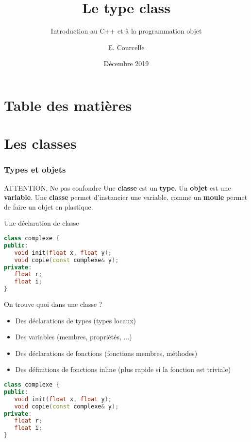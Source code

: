 \documentclass{beamer}
\title{Le type class}
\subtitle{Introduction au C++ et à la programmation objet}
\author{E. Courcelle}\institute{CALMIP, URA 3667}
\date{Décembre 2019}
\begin{document}
\begin{frame}
\titlepage
\end{frame}

\section*{Table des matières}
\begin{frame}
\tableofcontents
\end{frame}


\section{Les classes}

\begin{frame}[fragile=singleslide,shrink=20]
\frametitle {Types et objets}

\begin{block}{ATTENTION, Ne pas confondre}
Une \textbf{classe} est un \textbf{type}.
Un \textbf{objet} est une \textbf{variable}.
Une \textbf{classe} permet d'instancier une variable, comme un \textbf{moule} permet de faire un objet en plastique.
\end{block}

\begin{block}{Une déclaration de classe}
\begin{lstlisting}[language=c++]
class complexe {
public:
   void init(float x, float y);
   void copie(const complexe& y);
private:
   float r;
   float i;
}
\end{lstlisting}
\end{block}

\begin{block}{On trouve quoi dans une classe ?}
\begin{itemize}
\item{Des déclarations de types (types locaux)}
\item{Des variables (membres, propriétés, ...)}
\item{Des déclarations de fonctions (fonctions membres, méthodes)}
\item{Des définitions de fonctions inline (plus rapide si la fonction est triviale)}
\end{itemize}
\begin{lstlisting}[language=c++]
class complexe {
public:
   void init(float x, float y);
   void copie(const complexe& y);
private:
   float r;
   float i;
}
\end{lstlisting}
\end{block}
\end{frame}
\end{document}
